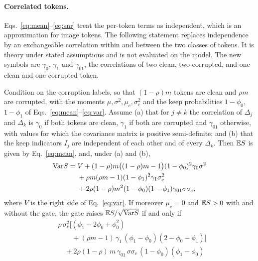 \paragraph{Correlated tokens.}\label{par:snrcorr}
Eqs.~\eqref{eq:mean}--\eqref{eq:snr} treat the per-token terms as independent, which is an approximation for image tokens.
The following statement replaces independence by an exchangeable correlation within and between the two classes of tokens.
It is theory under stated assumptions and is not evaluated on the model.
The new symbols are $\gamma_0$, $\gamma_1$ and $\gamma_{01}$, the correlations of two clean, two corrupted, and one clean and one
corrupted token.

\begin{proposition}\label{prop:snrcorr}
Condition on the corruption labels, so that $(1-\rho)m$ tokens are clean and $\rho m$ are corrupted, with the moments
$\mu,\sigma^2,\mu_c,\sigma_c^2$ and the keep probabilities $1-\phi_0$, $1-\phi_1$ of Eqs.~\eqref{eq:mean}--\eqref{eq:var}.
Assume (a) that for $j\neq k$ the correlation of $\Delta_j$ and $\Delta_k$ is $\gamma_0$ if both tokens are clean, $\gamma_1$ if both
are corrupted and $\gamma_{01}$ otherwise, with values for which the covariance matrix is positive semi-definite; and (b) that the
keep indicators $I_j$ are independent of each other and of every $\Delta_k$.
Then $\mathbb{E} S$ is given by Eq.~\eqref{eq:mean}, and, under (a) and (b),
\begin{equation}
\begin{aligned}
\mathrm{Var} S={}&V+(1-\rho)m\big((1-\rho)m-1\big)(1-\phi_0)^2\gamma_0\sigma^2\\
&+\rho m(\rho m-1)(1-\phi_1)^2\gamma_1\sigma_c^2\\
&+2\rho(1-\rho)m^2(1-\phi_0)(1-\phi_1)\gamma_{01}\sigma\sigma_c,
\end{aligned}
\label{eq:varcorr}
\end{equation}
where $V$ is the right side of Eq.~\eqref{eq:var}.
If moreover $\mu_c=0$ and $\mathbb{E} S>0$ with and without the gate, the gate raises $\mathbb{E} S/\sqrt{\mathrm{Var} S}$ if and only if
\begin{equation}
\begin{aligned}
&\rho\,\sigma_c^2\Big[(\phi_1-2\phi_0+\phi_0^2)\\
&\qquad+(\rho m-1)\,\gamma_1\,(\phi_1-\phi_0)(2-\phi_0-\phi_1)\Big]\\
&\quad+2\rho(1-\rho)\,m\,\gamma_{01}\,\sigma\sigma_c\,(1-\phi_0)(\phi_1-\phi_0)\\

\end{aligned}
\end{equation}
\end{proposition}
